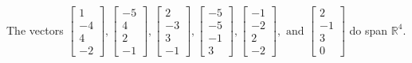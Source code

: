 \begin{exercise}
\begin{exerciseStatement}
  \end{exerciseStatement}
  \begin{exerciseAnswer}
   The vectors \(\left[\begin{array}{r}
1 \\
-4 \\
4 \\
-2
\end{array}\right] , \left[\begin{array}{r}
-5 \\
4 \\
2 \\
-1
\end{array}\right] , \left[\begin{array}{r}
2 \\
-3 \\
3 \\
-1
\end{array}\right] , \left[\begin{array}{r}
-5 \\
-5 \\
-1 \\
3
\end{array}\right] , \left[\begin{array}{r}
-1 \\
-2 \\
2 \\
-2
\end{array}\right] , \text{ and } \left[\begin{array}{r}
2 \\
-1 \\
3 \\
0
\end{array}\right]\) 
  	 do  
	span \(\mathbb{R}^4\).
  


  \end{exerciseAnswer}
\end{exercise}